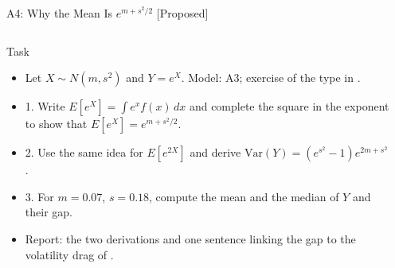\begin{frame}{A4: Why the Mean Is $e^{m + s^2/2}$ [Proposed]}
\propsub
\itemsize{\scriptsize}
\begin{columns}[T]
\begin{column}{\taskw}
\begin{block}{Task}
\begin{itemize}
    \item Let $X \sim N(m, s^2)$ and $Y = e^X$. Model: A3; exercise of the type in .
    \item 1. Write $E[e^X] = \int e^x f(x)\,dx$ and complete the square in the exponent to show that $E[e^X] = e^{m + s^2/2}$.
    \item 2. Use the same idea for $E[e^{2X}]$ and derive $\text{Var}(Y) = (e^{s^2} - 1)e^{2m + s^2}$.
    \item 3. For $m = 0.07$, $s = 0.18$, compute the mean and the median of $Y$ and their gap.
    \item Report: the two derivations and one sentence linking the gap to the volatility drag of .
\end{itemize}
\end{block}
\end{column}
\begin{column}{\solw}
\end{column}
\end{columns}
\end{frame}

